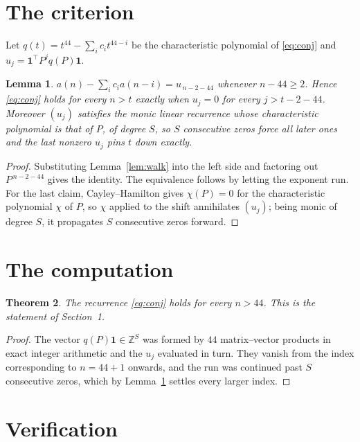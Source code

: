 \documentclass[11pt,a4paper]{article}
\theoremstyle{plain}
\newtheorem{theorem}{Theorem}
\newtheorem{lemma}[theorem]{Lemma}
\theoremstyle{definition}
\begin{document}
\section{The criterion}

Let $q(t)=t^{44}-\sum_i c_i t^{44-i}$ be the characteristic polynomial of
\eqref{eq:conj} and $u_j=\mathbf{1}^{\!\top}P^{j}q(P)\mathbf{1}$.

\begin{lemma}\label{lem:crit}
$a(n)-\sum_i c_i a(n-i)=u_{\,n-2-44}$ whenever $n-44\ge2$. Hence
\eqref{eq:conj} holds for every $n>t$ exactly when $u_j=0$ for every
$j>t-2-44$. Moreover $(u_j)$ satisfies the monic linear recurrence whose
characteristic polynomial is that of $P$, of degree $S$, so $S$ consecutive zeros force all
later ones and the last nonzero $u_j$ pins $t$ down exactly.
\end{lemma}

\begin{proof}
Substituting Lemma~\ref{lem:walk} into the left side and factoring out
$P^{\,n-2-44}$ gives the identity. The equivalence follows by letting the exponent
run. For the last claim, Cayley--Hamilton gives $\chi(P)=0$ for the characteristic
polynomial $\chi$ of $P$, so $\chi$ applied to the shift annihilates $(u_j)$; being monic of
degree $S$, it propagates $S$ consecutive zeros forward.
\end{proof}

\section{The computation}

\begin{theorem}
The recurrence \eqref{eq:conj} holds for every $n>44$. This is the statement of
Section~1.
\end{theorem}

\begin{proof}
The vector $q(P)\mathbf{1}\in\mathbb{Z}^{S}$ was formed by $44$ matrix--vector
products in exact integer arithmetic and the $u_j$ evaluated in turn. They vanish from the
index corresponding to $n=44+1$ onwards, and the run was continued past $S$ consecutive
zeros, which by Lemma~\ref{lem:crit} settles every larger index.
\end{proof}

\section{Verification}
\end{document}
